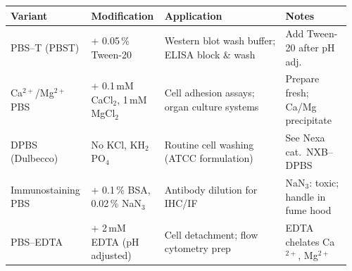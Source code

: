 \documentclass[10pt,a4paper]{article}
\begin{document}
\begin{tcolorbox}[
  enhanced, arc=4pt, boxrule=0.6pt,
  colback=NexaGold!8, colframe=NexaGold,
  title={\faLayerGroup\enskip Common Variants \& Modifications},
  fonttitle=\bfseries\color{white}, coltitle=white,
  attach boxed title to top left={yshift=-2mm,xshift=4mm},
  boxed title style={enhanced, arc=3pt, colback=NexaGold, colframe=NexaGold, boxrule=0pt},
  top=6mm, bottom=3mm, left=2mm, right=2mm,
]

\renewcommand{\arraystretch}{1.4}
\small
\begin{tabularx}{\linewidth}{@{}
    L{0.22\linewidth}
    L{0.20\linewidth}
    L{0.35\linewidth}
    L{0.19\linewidth}
  @{}}
  \color{NexaText}\bfseries Variant &
  \color{NexaText}\bfseries Modification &
  \color{NexaText}\bfseries Application &
  \color{NexaText}\bfseries Notes \\
  \midrule
  PBS--T (PBST) &
    + 0.05\,\% Tween-20 &
    Western blot wash buffer; ELISA block \& wash &
    Add Tween-20 after pH adj. \\
  Ca$^{2+}$/Mg$^{2+}$ PBS &
    + 0.1\,mM CaCl$_2$, 1\,mM MgCl$_2$ &
    Cell adhesion assays; organ culture systems &
    Prepare fresh; Ca/Mg precipitate \\
  DPBS (Dulbecco) &
    No KCl, KH$_2$PO$_4$ &
    Routine cell washing (ATCC formulation) &
    See Nexa cat.\ NXB--DPBS \\
  Immunostaining PBS &
    + 0.1\,\% BSA, 0.02\,\% NaN$_3$ &
    Antibody dilution for IHC/IF &
    NaN$_3$: toxic; handle in fume hood \\
  PBS--EDTA &
    + 2\,mM EDTA (pH adjusted) &
    Cell detachment; flow cytometry prep &
    EDTA chelates Ca$^{2+}$, Mg$^{2+}$ \\
\end{tabularx}

\end{tcolorbox}

\vspace{5mm}
\end{document}
